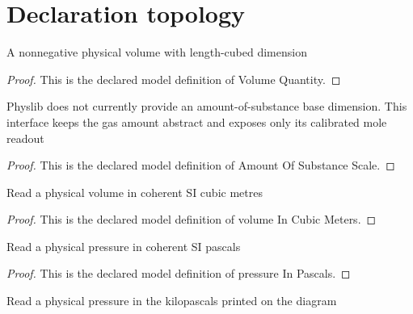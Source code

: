 \section{Declaration topology}
\begin{definition}
  \label{def:physics:phyx-mini-0370:phyxminiproblems-problemphyxmini0370-volumequantity}
  A nonnegative physical volume with length-cubed dimension
\end{definition}
\begin{proof}
  This is the declared model definition of Volume Quantity.
\end{proof}
\begin{definition}
  \label{def:physics:phyx-mini-0370:phyxminiproblems-problemphyxmini0370-amountofsubstancescale}
  Physlib does not currently provide an amount-of-substance base dimension. This interface keeps the gas amount abstract and exposes only its calibrated mole readout
\end{definition}
\begin{proof}
  This is the declared model definition of Amount Of Substance Scale.
\end{proof}
\begin{definition}
  \label{def:physics:phyx-mini-0370:phyxminiproblems-problemphyxmini0370-volumeincubicmeters}
  Read a physical volume in coherent SI cubic metres
\end{definition}
\begin{proof}
  This is the declared model definition of volume In Cubic Meters.
\end{proof}
\begin{definition}
  \label{def:physics:phyx-mini-0370:phyxminiproblems-problemphyxmini0370-pressureinpascals}
  Read a physical pressure in coherent SI pascals
\end{definition}
\begin{proof}
  This is the declared model definition of pressure In Pascals.
\end{proof}
\begin{definition}
  \label{def:physics:phyx-mini-0370:phyxminiproblems-problemphyxmini0370-pressureinkilopascals}
  Read a physical pressure in the kilopascals printed on the diagram
\end{definition}
